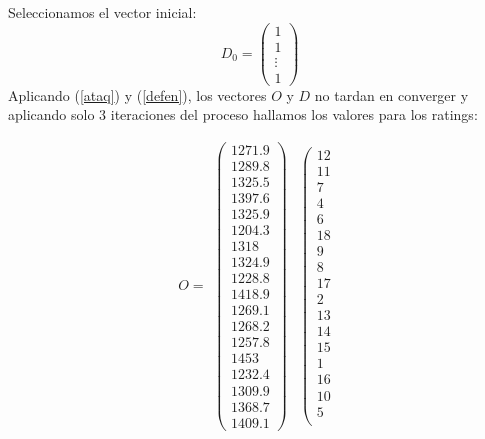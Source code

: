 	Seleccionamos el vector inicial:
	\begin{equation*}
		D_{0} = 
		\left( \begin{array}{c}
			1\\
			1\\
			\vdots\\
			1
		\end{array}\right) 
	\end{equation*}
	Aplicando (\ref{ataq}) y (\ref{defen}), los vectores $O$ y $D$ no tardan en converger y aplicando solo 3 iteraciones del proceso hallamos los valores para los ratings:
	
	\[O=
	\begin{array}{ccc}
	\left(\begin{array}{c}
				1271.9\\
				1289.8\\
				1325.5\\
				1397.6\\
				1325.9\\
				1204.3\\
				1318\\
				1324.9\\
				1228.8\\
				1418.9\\
				1269.1\\
				1268.2\\
				1257.8\\
				1453\\
				1232.4\\
				1309.9\\
				1368.7\\
				1409.1
	\end{array} \right) & \left(\begin{array}{c}
				12\\
				11\\
				7\\
				4\\
				6\\
				18\\
				9\\
				8\\
				17\\
				2\\
				13\\
				14\\
				15\\
				1\\
				16\\
				10\\
				5\\

\end{array}
\end{array}\]
